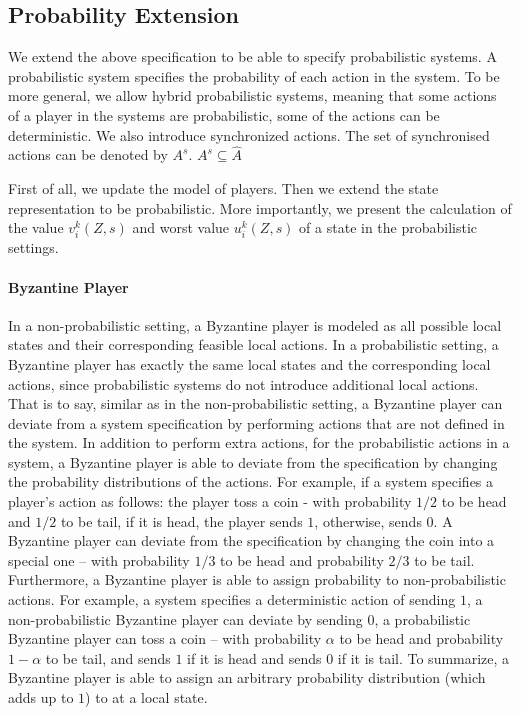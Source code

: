 \subsection{Probability Extension}\label{ssec:prob_act}

We extend the above specification to be able to specify probabilistic systems. A probabilistic system specifies the probability of each action in the system. To be more general, we allow hybrid probabilistic systems, meaning that some actions of a player in the systems are probabilistic, some of the actions can be deterministic. We also introduce synchronized actions. The set of synchronised actions can be denoted by $A^s$. $A^s \subseteq \hat{A}$ 

First of all, we update the model of players. Then we extend the state representation to be probabilistic. More importantly, we present the calculation of the value $v_i^{k}(Z, s)$ and worst value $u_i^{k}(Z, s)$ of a state in the probabilistic settings.

\paragraph{Byzantine Player}
In a non-probabilistic setting, a Byzantine player is modeled as all possible local states and their corresponding feasible local actions.
In a probabilistic setting, a Byzantine player has exactly the same local states and the corresponding local actions, since probabilistic systems do not introduce additional local actions.
That is to say, similar as in the non-probabilistic setting, a Byzantine player can deviate from a system specification by performing actions that are not defined in the system.
In addition to perform extra actions, for the probabilistic actions in a system, a Byzantine player is able to deviate from the specification by changing the probability distributions of the actions. For example, if a system specifies a player's action as follows: the player toss a coin - with probability $1/2$ to be head and $1/2$ to be tail, if it is head, the player sends $1$, otherwise, sends $0$. A Byzantine player can deviate from the specification by changing the coin into a special one -- with probability $1/3$ to be head and probability $2/3$ to be tail. Furthermore, a Byzantine player is able to assign probability to non-probabilistic actions. For example, a system specifies a deterministic action of sending $1$, a non-probabilistic Byzantine player can deviate by sending $0$, a probabilistic Byzantine player can toss a coin -- with probability $\alpha$ to be head and probability $1-\alpha$ to be tail, and sends $1$ if it is head and sends $0$ if it is tail. To summarize, a Byzantine player is able to assign an arbitrary probability distribution (which adds up to $1$) to at a local state.



